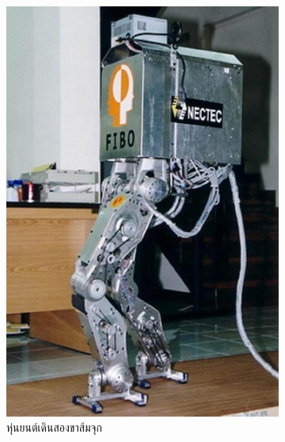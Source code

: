 \begin{figure}[htbp]
\begin{subfigure}[b]{0.3\textwidth}
        \includegraphics[width=\textwidth]{chapter2/images/ส้มจุก.jpg}
        \caption{หุ่นยนต์เดินสองขาส้มจุก}
        \label{fig:ส้มจุก}
    \end{subfigure}
    \hfill
    \begin{subfigure}[b]{0.3\textwidth}
        \centering

\end{subfigure}
\end{figure}
